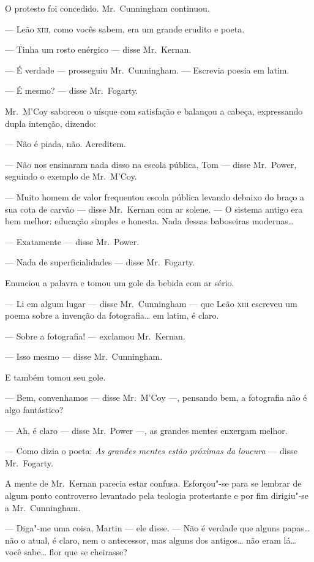 O protesto foi concedido.  Mr.~Cunningham continuou.

--- Leão \textsc{xiii}, como vocês sabem, era um grande erudito e poeta.

--- Tinha um rosto enérgico --- disse Mr.~Kernan.

--- É verdade --- prosseguiu Mr.~Cunningham.  --- Escrevia poesia em latim.

--- É mesmo? --- disse Mr.~Fogarty.

Mr.~M’Coy saboreou o uísque com satisfação e balançou a cabeça, expressando
dupla intenção, dizendo:

--- Não é piada, não.  Acreditem.

--- Não nos ensinaram nada disso na escola pública, Tom --- disse Mr.~Power,
seguindo o exemplo de Mr.~M’Coy.

--- Muito homem de valor frequentou escola pública levando debaixo do braço a
sua cota de carvão --- disse Mr.~Kernan com ar solene.  --- O sistema antigo
era bem melhor: educação simples e honesta.  Nada dessas baboseiras
modernas\ldots{}

--- Exatamente --- disse Mr.~Power.

--- Nada de superficialidades --- disse Mr.~Fogarty.

Enunciou a palavra e tomou um gole da bebida com ar sério.

--- Li em algum lugar --- disse Mr.~Cunningham --- que Leão \textsc{xiii} escreveu um
poema sobre a invenção da fotografia\ldots{} em latim, é claro.

--- Sobre a fotografia! --- exclamou Mr.~Kernan.

--- Isso mesmo --- disse Mr.~Cunningham.

E também tomou seu gole.

--- Bem, convenhamos --- disse Mr.~M’Coy ---, pensando bem, a fotografia não é
algo fantástico?

--- Ah, é claro --- disse Mr.~Power ---, as grandes mentes enxergam melhor.

--- Como dizia o poeta: \textit{As grandes mentes estão próximas da
loucura} --- disse Mr.~Fogarty.

A mente de Mr.~Kernan parecia estar confusa.  Esforçou"-se para se lembrar de
algum ponto controverso levantado pela teologia protestante e por fim
dirigiu"-se a Mr.~Cunningham.

--- Diga"-me uma coisa, Martin --- ele disse.  --- Não é verdade que alguns
papas\ldots{} não o atual, é claro, nem o antecessor, mas alguns dos
antigos\ldots{} não eram lá\ldots{} você sabe\ldots{} flor que se cheirasse?

